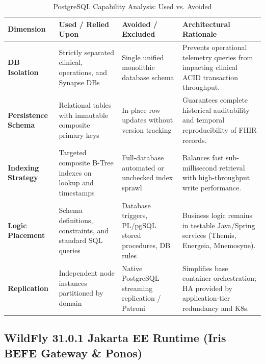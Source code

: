 \begin{table}[htbp]
\centering
\scriptsize
\begin{tabularx}{\textwidth}{P{3.0cm} P{3.8cm} P{3.8cm} Y}
\toprule
\textbf{Dimension} & \textbf{Used / Relied Upon} & \textbf{Avoided / Excluded} & \textbf{Architectural Rationale} \\
\midrule
\textbf{DB Isolation} & Strictly separated clinical, operations, and Synapse DBs & Single unified monolithic database schema & Prevents operational telemetry queries from impacting clinical ACID transaction throughput. \\
\addlinespace
\textbf{Persistence Schema} & Relational tables with immutable composite primary keys & In-place row updates without version tracking & Guarantees complete historical auditability and temporal reproducibility of FHIR records. \\
\addlinespace
\textbf{Indexing Strategy} & Targeted composite B-Tree indexes on lookup and timestamps & Full-database automated or unchecked index sprawl & Balances fast sub-millisecond retrieval with high-throughput write performance. \\
\addlinespace
\textbf{Logic Placement} & Schema definitions, constraints, and standard SQL queries & Database triggers, PL/pgSQL stored procedures, DB rules & Business logic remains in testable Java/Spring services (Themis, Energeia, Mnemosyne). \\
\addlinespace
\textbf{Replication} & Independent node instances partitioned by domain & Native PostgreSQL streaming replication / Patroni & Simplifies base container orchestration; HA provided by application-tier redundancy and K8s. \\
\bottomrule
\end{tabularx}
\caption{PostgreSQL Capability Analysis: Used vs. Avoided}
\label{tab:postgres_used_vs_avoided}
\end{table}

\subsection{WildFly 31.0.1 Jakarta EE Runtime (Iris BEFE Gateway \& Ponos)}

